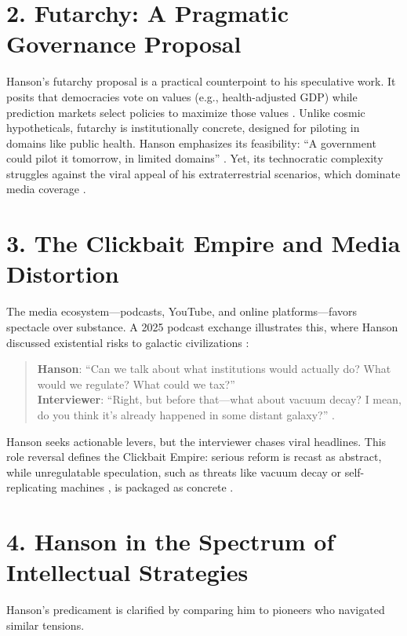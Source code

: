 \documentclass[11pt]{article}
\begin{document}
\section*{2. Futarchy: A Pragmatic Governance Proposal}

Hanson’s futarchy proposal is a practical counterpoint to his speculative work. It posits that democracies vote on values (e.g., health-adjusted GDP) while prediction markets select policies to maximize those values \citep{Hanson2013-HANSWV,ash2021c}. Unlike cosmic hypotheticals, futarchy is institutionally concrete, designed for piloting in domains like public health. Hanson emphasizes its feasibility: ``A government could pilot it tomorrow, in limited domains'' \citep{ash2021c}. Yet, its technocratic complexity struggles against the viral appeal of his extraterrestrial scenarios, which dominate media coverage \citep{bbc2021}.

\section*{3. The Clickbait Empire and Media Distortion}

The media ecosystem---podcasts, YouTube, and online platforms---favors spectacle over substance. A 2025 podcast exchange illustrates this, where Hanson discussed existential risks to galactic civilizations \citep{stone2025}:

\begin{quote}
\textbf{Hanson}: ``Can we talk about what institutions would actually do? What would we regulate? What could we tax?'' \\
\textbf{Interviewer}: ``Right, but before that---what about vacuum decay? I mean, do you think it’s already happened in some distant galaxy?'' \citep{hansonstone2025}.
\end{quote}

Hanson seeks actionable levers, but the interviewer chases viral headlines. This role reversal defines the Clickbait Empire: serious reform is recast as abstract, while unregulatable speculation, such as threats like vacuum decay or self-replicating machines \citep{stone2025}, is packaged as concrete \citep{fridman2021b,bbc2021}.

\section*{4. Hanson in the Spectrum of Intellectual Strategies}

Hanson’s predicament is clarified by comparing him to pioneers who navigated similar tensions.
\end{document}
